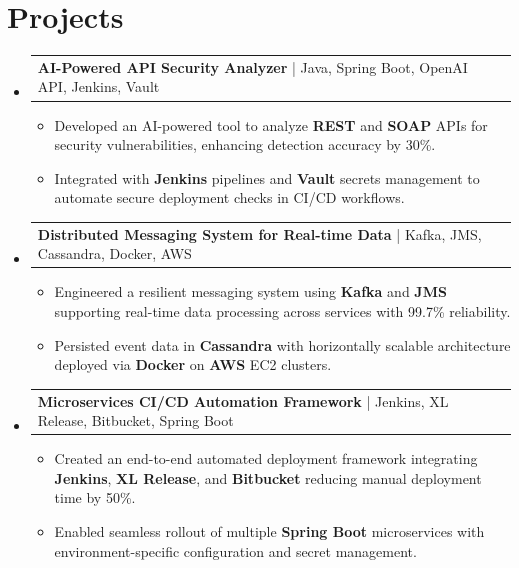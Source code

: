 \documentclass[letterpaper,11pt]{article}
\makeatletter
\newcommand{\resumeItem}[1]{
  \item\footnotesize{
    {#1 \vspace{-2pt}}
  }
}
\newcommand{\resumeProjectHeading}[2]{
    \item
    \begin{tabular*}{1.001\textwidth}{l@{\extracolsep{\fill}}r}
      \small#1 & \textbf{\small #2}\\
    \end{tabular*}\vspace{-7pt}
}
\newcommand{\resumeSubHeadingListStart}{\begin{itemize}[leftmargin=0pt, label={}]}
\newcommand{\resumeSubHeadingListEnd}{\end{itemize}}
\newcommand{\resumeItemListStart}{\begin{itemize}[leftmargin=*]}
\newcommand{\resumeItemListEnd}{\end{itemize}\vspace{-5pt}}
\makeatother
\begin{document}
\section{Projects}
    \vspace{-5pt}
    \resumeSubHeadingListStart
          \resumeProjectHeading
              {\textbf{AI-Powered API Security Analyzer} | Java, Spring Boot, OpenAI API, Jenkins, Vault}{}
        \resumeItemListStart
            \resumeItem{Developed an AI-powered tool to analyze \textbf{REST} and \textbf{SOAP} APIs for security vulnerabilities, enhancing detection accuracy by 30\%.}
            \resumeItem{Integrated with \textbf{Jenkins} pipelines and \textbf{Vault} secrets management to automate secure deployment checks in CI/CD workflows.}
        \resumeItemListEnd
        \vspace{-12pt}
    
    \resumeProjectHeading
        {\textbf{Distributed Messaging System for Real-time Data} | Kafka, JMS, Cassandra, Docker, AWS}{}
        \resumeItemListStart
            \resumeItem{Engineered a resilient messaging system using \textbf{Kafka} and \textbf{JMS} supporting real-time data processing across services with 99.7\% reliability.}
            \resumeItem{Persisted event data in \textbf{Cassandra} with horizontally scalable architecture deployed via \textbf{Docker} on \textbf{AWS} EC2 clusters.}
        \resumeItemListEnd
          \vspace{-12pt}
      \resumeProjectHeading
          {\textbf{Microservices CI/CD Automation Framework} | Jenkins, XL Release, Bitbucket, Spring Boot}{}
          \resumeItemListStart
              \resumeItem{Created an end-to-end automated deployment framework integrating \textbf{Jenkins}, \textbf{XL Release}, and \textbf{Bitbucket} reducing manual deployment time by 50\%.}
              \resumeItem{Enabled seamless rollout of multiple \textbf{Spring Boot} microservices with environment-specific configuration and secret management.}
          \resumeItemListEnd 
    \resumeSubHeadingListEnd
\end{document}
